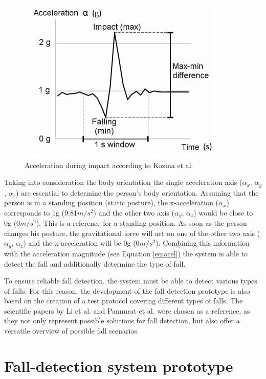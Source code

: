 \documentclass[review]{elsarticle}
\begin{document}
\begin{figure}[!ht]
	\centering
	\includegraphics[scale=1]{images/KozinaImpact}
	\caption[Acceleration during impact]{Acceleration during impact according to Kozina et al. ~\cite{Kozina}}
	\label{fig:fallKozina}
\end{figure}
Taking into consideration the body orientation the single acceleration axis ($\alpha_x$, $\alpha_y$, $\alpha_z$) are essential to determine the person's body orientation. Assuming that the person is in a standing position (static posture), the x-acceleration ($\alpha_x$) corresponds to 1g (9.81$m/s^{2}$) and the other two axis ($\alpha_y$, $\alpha_z$) would be close to 0g (0$m/s^{2}$). This is a reference for a standing position. As soon as the person changes his posture, the gravitational force will act on one of the other two axis ($\alpha_y$, $\alpha_z$) and the x-acceleration will be 0g (0$m/s^{2}$). Combining this information with the acceleration magnitude (see Equation \ref{eq:acel}) the system is able to detect the fall and additionally determine the type of fall.

To ensure reliable fall detection, the system must be able to detect various types of falls. For this reason, the development of the fall detection prototype is also based on the creation of a test protocol covering different types of falls. The scientific papers by Li et al. \cite{Li2009} and Pannurat et al. \cite{Pannurat2014} were chosen as a reference, as they not only represent possible solutions for fall detection, but also offer a versatile overview of possible fall scenarios.

\section{Fall-detection system prototype}
\label{sec:fall-detectionPrototype}	
\end{document}
